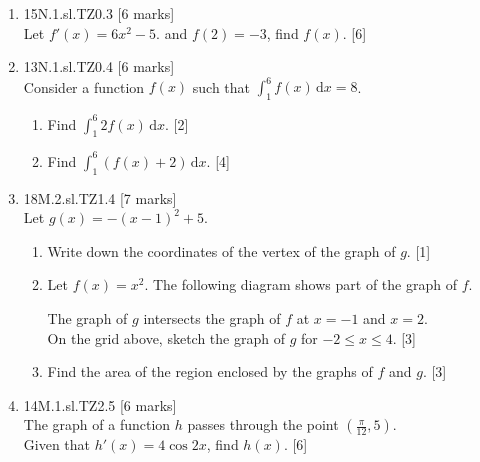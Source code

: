 \documentclass[12pt, twoside]{article}
\begin{document}
\begin{enumerate}
    \item 15N.1.sl.TZ0.3 \hfill [6 marks]\\
    Let $f'(x)=6x^2-5$. and $f(2)=-3$, find $f(x)$. [6]

    \item 13N.1.sl.TZ0.4 \hfill [6 marks]\\
    Consider a function $f(x)$ such that $\int_1^6 f(x) \,\mathrm{d}x
=8$.
    \begin{enumerate}
      \item Find $\int_1^6 2f(x) \,\mathrm{d}x$. \hfill [2]
      \item Find $\int_1^6 (f(x)+2) \,\mathrm{d}x$. \hfill [4]
    \end{enumerate}

    \item 18M.2.sl.TZ1.4 \hfill [7 marks]\\
    Let  $g(x)=-(x-1)^2+5$.
    \begin{enumerate}
      \item Write down the coordinates of the vertex of the graph of $g$. \hfill [1]
      \item Let $f(x)=x^2$. The following diagram shows part of the graph of $f$.
        \begin{center}
        \end{center}
      The graph of $g$ intersects the graph of $f$ at $x=-1$ and $x=2$.\\
      On the grid above, sketch the graph of $g$ for $-2 \leq x \leq 4$. \hfill [3]
      \item Find the area of the region enclosed by the graphs of $f$ and $g$. \hfill [3]
    \end{enumerate}

    \item 14M.1.sl.TZ2.5 \hfill [6 marks]\\
    The graph of a function $h$ passes through the point $(\frac{\pi}{12},5)$.\\
    Given that $h'(x)=4 \cos 2x$, find $h(x)$. \hfill [6]


\end{enumerate}
\end{document}
